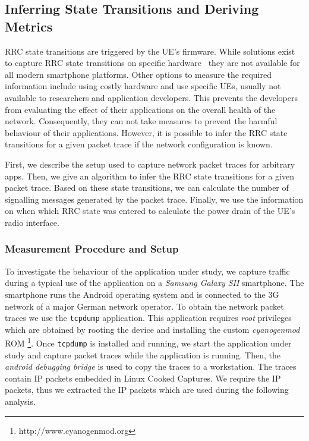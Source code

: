 \subsection{Inferring State Transitions and Deriving Metrics}\label{sec:network:network_traces:performance_evaluation}
\gls{RRC} state transitions are triggered by the \gls{UE}’s firmware.
While solutions exist to capture RRC state transitions on specific hardware~\cite{zayas2010} they are not available for all modern smartphone platforms.
Other options to measure the required information include using costly hardware and use specific \glspl{UE}, usually not available to researchers and application developers.
This prevents the developers from evaluating the effect of their applications on the overall health
of the network.
Consequently, they can not take measures to prevent the harmful behaviour of their applications.
However, it is possible to infer the \gls{RRC} state transitions for a given packet trace if the network configuration is known.

First, we describe the setup used to capture network packet traces for arbitrary apps.
Then, we give an algorithm to infer the \gls{RRC} state transitions for a given packet trace.
Based on these state transitions, we can calculate the number of signalling messages generated
by the packet trace. 
Finally, we use the information on when which \gls{RRC} state was entered to calculate the power drain of the \gls{UE}’s radio interface.

\subsubsection*{Measurement Procedure and Setup}\label{sec:network:network_traces:performance_evaluation:measurement}
To investigate the behaviour of the application under study, we capture traffic during a typical use of the application on a \emph{Samsung Galaxy SII} smartphone.
The smartphone runs the Android operating system and is connected to the \gls{3G} network of a major German network operator.
To obtain the network packet traces we use the \texttt{tcpdump} application.
This application requires \emph{root} privileges which are obtained by rooting the device and installing the custom \emph{cyanogenmod} ROM \footnote{http://www.cyanogenmod.org}.
Once \texttt{tcpdump} is installed and running, we start the application under study and capture packet traces while the application is running.
Then, the \emph{android debugging bridge} is used to copy the traces to a workstation.
The traces contain \gls{IP} packets embedded in Linux Cooked Captures.
We require the \gls{IP} packets, thus we extracted the \gls{IP} packets which are used during the following analysis.

